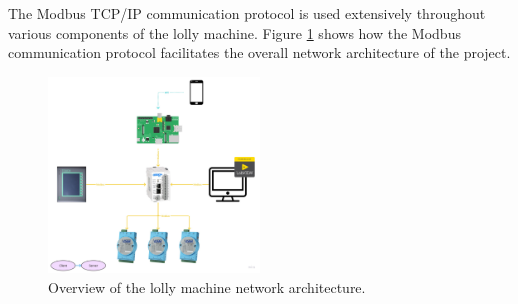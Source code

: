 The Modbus TCP/IP communication protocol is used extensively throughout various components of the lolly machine. Figure \ref{fig:overView} shows how the Modbus communication protocol facilitates the overall network architecture of the project.

        \begin{figure}[H]
            \centering
            \includegraphics[width = 0.5\textwidth]{2_images/overView.jpg}
            \caption{Overview of the lolly machine network architecture.}
            \label{fig:overView}
        \end{figure} 